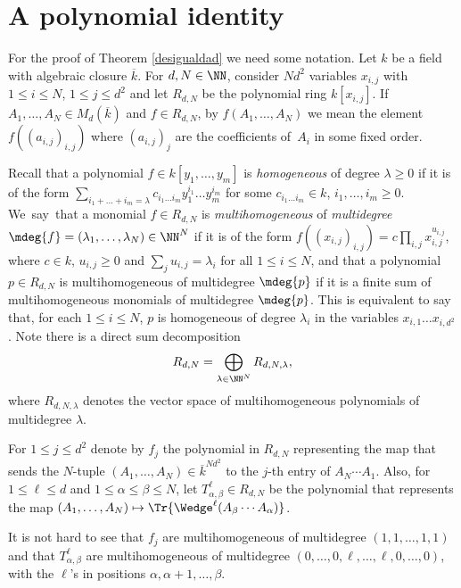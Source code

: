 \section{A polynomial identity}\label{secciontres}

For the proof of Theorem \ref{desigualdad} we need some notation. Let $k$ be a field with algebraic closure $\overline{k}$. For $d,N\in \NN$, consider $Nd^2$ variables $x_{i,j}$ with $1\leq i\leq N$, $1 \leq j \leq d^{2}$ and let $R_{d,N}$ be the polynomial ring $k[x_{i,j}]$. If $A_1,\dots,A_N \in M_{d}(\overline{k})$ and $f\in R_{d,N}$, by $f(A_1,\dots,A_N)$ we mean the element $f((a_{i,j})_{i,j})$ where $(a_{i,j})_{j}$ are the coefficients of~$A_i$ in some fixed order.

Recall that a polynomial $f\in k[y_1,\dots,y_m]$ is \textit{homogeneous} of degree $\lambda\geq 0$ if it is of the form $\sum_{i_1+\dots+i_m=\lambda}{c_{i_1\dots i_m}y_{1}^{i_1}\dots y_{m}^{i_m}}$ for some $c_{i_1\dots i_m}\in k$, \hbox{$i_1,\dots,i_m\geq 0$}. We~say~that a monomial $f\in R_{d,N}$ is \textit{multihomogeneous} of \textit{multidegree} $\mdeg{f}=(\lambda_1,\dots,\lambda_N) \in {\NN}^{N}$ if it is of the form $f((x_{i,j})_{i,j})=c\prod_{i,j}x^{u_{i,j}}_{i,j}$, where $c\in k$, $u_{i,j}\geq 0$ and $\sum_{j}{u_{i,j}}=\lambda_{i}$ for all $1\leq i\leq N$, and that a polynomial $p\in R_{d,N}$ is multihomogeneous of multidegree $\mdeg{p}$ if it is a finite sum of multihomogeneous monomials of multidegree $\mdeg{p}$. This is equivalent to say that, for each $1\leq i\leq N$, $p$ is homogeneous of degree $\lambda_i$ in the variables $x_{i,1} \dots x_{i,d^2}$. Note there is a direct sum decomposition
\begin{equation}\label{directsum}
R_{d,N}=\bigoplus_{\lambda \in {\NN}^{N}}{R_{d,N,\lambda}},
\end{equation} where $R_{d,N,\lambda}$ denotes the vector space of multihomogeneous polynomials of multidegree $\lambda$.

For $1\leq j\leq d^2$ denote by $f_{j}$ the polynomial in $R_{d,N}$ representing the map that sends the $N$-tuple $(A_1,\dots,A_N)\in \overline{k}^{Nd^2}$ to the $j$-th entry of $A_N\cdots A_1$. Also, for $1\leq \ell \leq d$ and $1\leq \alpha \leq \beta \leq N$, let $T^{\ell}_{\alpha,\beta} \in R_{d,N}$ be the polynomial that represents the map $(A_1,\dots,A_N)\mapsto \Tr{\Wedge^{\ell}(A_{\beta}\cdots A_{\alpha})}$.

It is not hard to see that $f_{j}$ are multihomogeneous of multidegree $(1,1,\dots,1,1)$ and that $T_{\alpha,\beta}^{\ell}$ are multihomogeneous of multidegree $(0,\dots,0,\ell,\dots,\ell,0,\dots,0)$, with the $\ell$'s in positions $\alpha,\alpha+1,\dots,\beta$.

